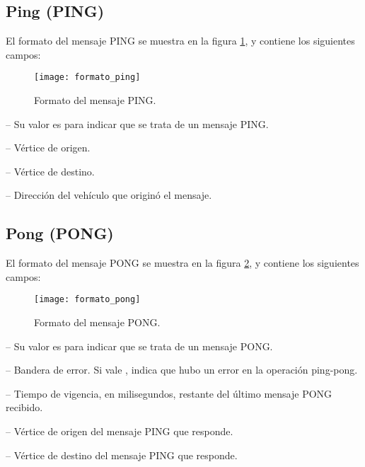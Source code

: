 \subsection{Ping (PING)}

\label{subsec:mensaje_ping}

El formato del mensaje PING se muestra en la figura \ref{fig:formato_ping}, y
contiene los siguientes campos:

\begin{figure}[th!]
\centering
\texttt{[image: formato\_ping]}
\decoRule
\caption[Formato del mensaje PING]{Formato del mensaje PING.}
\label{fig:formato_ping}
\end{figure}

 -- Su valor es  para indicar que se trata de un
mensaje PING.

 -- Vértice de origen.

 -- Vértice de destino.

 -- Dirección del vehículo que originó el
mensaje.

\subsection{Pong (PONG)}

\label{subsec:mensaje_pong}

El formato del mensaje PONG se muestra en la figura \ref{fig:formato_pong}, y
contiene los siguientes campos:

\begin{figure}[th!]
\centering
\texttt{[image: formato\_pong]}
\decoRule
\caption[Formato del mensaje PONG]{Formato del mensaje PONG.}
\label{fig:formato_pong}
\end{figure}

 -- Su valor es  para indicar que se trata de un
mensaje PONG.

 -- Bandera de error. Si vale , indica que hubo un
error en la operación ping-pong.

 -- Tiempo de vigencia, en milisegundos, restante
del último mensaje PONG recibido.

 -- Vértice de origen del mensaje PING que
responde.

 -- Vértice de destino del mensaje PING que
responde.

